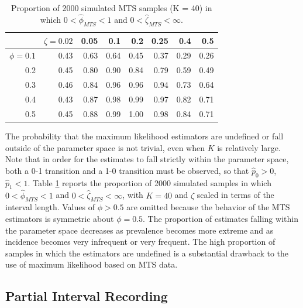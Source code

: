 \documentclass[man, noextraspace, floatsintext]{apa6}\usepackage[]{graphicx}\usepackage[]{color}
\begin{document}
\begin{table}[b]
\centering
\caption{Proportion of 2000 simulated MTS samples (K = 40) in which $0 < \hat\phi_{MTS} < 1$ and $0 < \hat\zeta_{MTS} < \infty$.} 
\label{tab:MTS_zeta_valid}
\begin{tabular}{rrrrrrrr}
  \hline
 & $\zeta = 0.02$ & 0.05 & 0.1 & 0.2 & 0.25 & 0.4 & 0.5 \\ 
  \hline
$\phi = 0.1$ & 0.43 & 0.63 & 0.64 & 0.45 & 0.37 & 0.29 & 0.26 \\ 
  0.2 & 0.45 & 0.80 & 0.90 & 0.84 & 0.79 & 0.59 & 0.49 \\ 
  0.3 & 0.46 & 0.84 & 0.96 & 0.96 & 0.94 & 0.73 & 0.64 \\ 
  0.4 & 0.43 & 0.87 & 0.98 & 0.99 & 0.97 & 0.82 & 0.71 \\ 
  0.5 & 0.45 & 0.88 & 0.99 & 1.00 & 0.98 & 0.84 & 0.71 \\ 
   \hline
\end{tabular}
\end{table}


The probability that the maximum likelihood estimators are undefined or fall outside of the parameter space is not trivial, even when $K$ is relatively large. 
Note that in order for the estimates to fall strictly within the parameter space, both a 0-1 transition and a 1-0 transition must be observed, so that $\hat{p}_0 > 0$, $\hat{p}_1 < 1$. Table \ref{tab:MTS_zeta_valid} reports the proportion of 2000 simulated samples in which $0 < \hat\phi_{MTS} < 1$ and $0 < \hat\zeta_{MTS} < \infty$, with $K = 40$ and $\zeta$ scaled in terms of the interval length. 
Values of $\phi > 0.5$ are omitted because the behavior of the MTS estimators is symmetric about $\phi = 0.5$. 
The proportion of estimates falling within the parameter space decreases as prevalence becomes more extreme and as incidence becomes very infrequent or very frequent. 
The high proportion of samples in which the estimators are undefined is a substantial drawback to the use of maximum likelihood based on MTS data.

\subsection{Partial Interval Recording}
\label{subsec:PIR}
\end{document}
